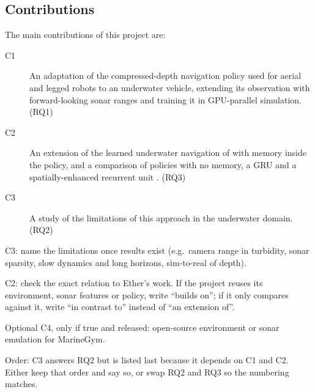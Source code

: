 \subsection{Contributions}
\label{sec:contributions}
The main contributions of this project are:
\begin{description}
    \item[C1] An adaptation of the compressed-depth navigation policy used for aerial and legged robots \parencite{kulkarni2024dce} to an underwater vehicle, extending its observation with forward-looking sonar ranges and training it in GPU-parallel simulation. (RQ1)
    \item[C2] An extension of the learned underwater navigation of \textcite{deowan2026unified} with memory inside the policy, and a comparison of policies with no memory, a GRU and a spatially-enhanced recurrent unit \parencite{yang2026spatially}. (RQ3)
    \item[C3] A study of the limitations of this approach in the underwater domain. (RQ2)
\end{description}
\begin{todolist}
  \item C3: name the limitations once results exist (e.g.\ camera range in turbidity, sonar sparsity, slow dynamics and long horizons, sim-to-real of depth).
  \item C2: check the exact relation to Ether's work. If the project reuses its environment, sonar features or policy, write ``builds on''; if it only compares against it, write ``in contrast to'' instead of ``an extension of''.
  \item Optional C4, only if true and released: open-source environment or sonar emulation for MarineGym.
  \item Order: C3 answers RQ2 but is listed last because it depends on C1 and C2. Either keep that order and say so, or swap RQ2 and RQ3 so the numbering matches.
\end{todolist}

